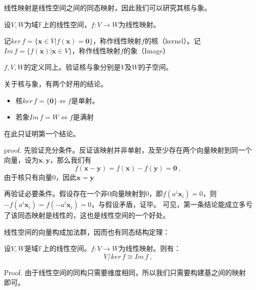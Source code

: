 
\begin{issues}
\issueDraft
\end{issues}

线性映射是线性空间之间的同态映射，因此我们可以研究其核与象。
\begin{definition}{}
设$V,W$为域$\mathbb F$上的线性空间，$f:V\rightarrow W$为线性映射。

记$ker\,f=\{\boldsymbol x\in V|f(\boldsymbol x)=\boldsymbol 0\}$，称作线性映射$f$的核（kernel）。记$Im\,f=\{f(\boldsymbol x)|\boldsymbol x\in V\}$，称作线性映射$f$的象（Image）
\end{definition}
\begin{exercise}{}
$f,V,W$的定义同上。验证核与象分别是$V$及$W$的子空间。
\end{exercise}
关于核与象，有两个好用的结论。
\begin{itemize}
\item 核$ker\,f=\{\boldsymbol 0\}\Longleftrightarrow f$是单射。
\item 若象$Im\,f=W\Longleftrightarrow f$是满射
\end{itemize}
在此只证明第一个结论。

proof.
先验证充分条件。反证该映射并非单射，及至少存在两个向量映射到同一个向量，设为$\boldsymbol{x,y}$，那么我们有
\begin{equation}
f(\boldsymbol{x}-\boldsymbol{y})=f(\boldsymbol x)-f(\boldsymbol y)=\boldsymbol 0~,
\end{equation}
由于核只有向量$0$，因此$\boldsymbol {x}=\boldsymbol{y}$

再验证必要条件。假设存在一个非$0$向量映射到$0$，即$f(a^i\boldsymbol x_i)=0$，则$-f(a^i\boldsymbol x_i)=f(-a^i\boldsymbol x_i)=0$，与假设矛盾，证毕。
可见，第一条结论能成立多亏了该同态映射是线性的，这也是线性空间的一个好处。

线性空间的向量构成加法群，因而也有同态结构定理：
\begin{theorem}{}
设$V,W$是域$\mathbb F$上的线性空间。$f:V\rightarrow W$为线性映射。则有：
\begin{equation}
V/ker \,f\cong Im\,f~,
\end{equation}
\end{theorem}
Proof.
由于线性空间的同构只需要维度相同，所以我们只需要构建基之间的映射即可。

